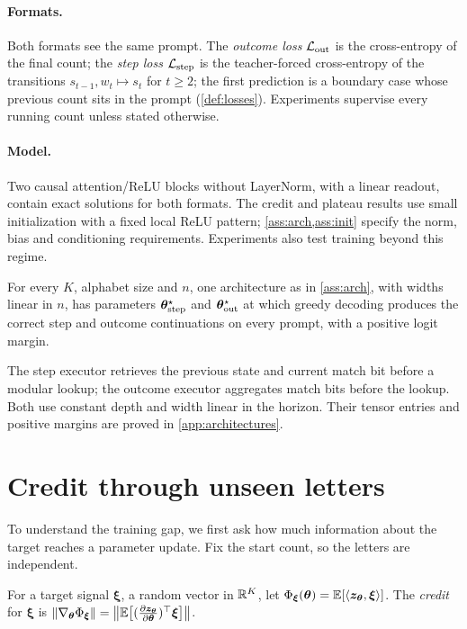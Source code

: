\paragraph{Formats.} Both formats see the same prompt. The \emph{outcome loss} $\mathcal L_{\mathrm{out}}$ is the cross-entropy of the final
count; the \emph{step loss} $\mathcal L_{\mathrm{step}}$ is the teacher-forced cross-entropy of the transitions $s_{t-1},w_t\mapsto s_t$ for
$t\ge2$; the first prediction is a boundary case whose previous count sits in the prompt (\cref{def:losses}). Experiments
supervise every running count unless stated otherwise.

\paragraph{Model.} Two causal attention/ReLU blocks without LayerNorm, with a linear readout,
contain exact solutions for both formats. The credit and plateau results use small initialization
with a fixed local ReLU pattern; \cref{ass:arch,ass:init} specify the norm, bias and conditioning
requirements. Experiments also test training beyond this regime.

\begin{proposition}
\label{prop:represent}
For every $K$, alphabet size and $n$, one architecture as in \cref{ass:arch}, with widths linear in $n$, has parameters
$\bm\theta^\star_{\mathrm{step}}$ and $\bm\theta^\star_{\mathrm{out}}$ at which greedy decoding produces the correct step and outcome continuations on every prompt, with
a positive logit margin.
\end{proposition}

The step executor retrieves the previous state and current match bit before a modular lookup;
the outcome executor aggregates match bits before the lookup. Both use constant depth and width
linear in the horizon. Their tensor entries and positive margins are proved in \cref{app:architectures}.

\section{Credit through unseen letters}
\label{sec:credit}

To understand the training gap, we first ask how much information about the target reaches a parameter update.
Fix the start count, so the letters are independent.

\begin{definition}[Credit]
\label{def:credit}
For a target signal $\bm\xi$, a random vector in $\mathbb R^K$, let $\Phi_{\bm\xi}(\bm\theta)=\mathbb E[\langle\bm z_{\bm\theta},\bm\xi\rangle]$. The
\emph{credit} for $\bm\xi$ is $\|\nabla_{\bm\theta}\cred_{\bm\xi}\|=\bigl\|\E\bigl[(\Jz)^\top\bm\xi\bigr]\bigr\|$.
\end{definition}

